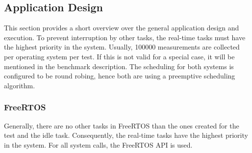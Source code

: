 \subsection{Application Design}
This section provides a short overview over the general application design and execution.
To prevent interruption by other tasks, the real-time tasks must have the highest priority in the system.
Usually, 100000 measurements are collected per operating system per test.
If this is not valid for a special case, it will be mentioned in the benchmark description.
The scheduling for both systems is configured to be round robing, hence both are using a preemptive scheduling algorithm.
 
\subsubsection{FreeRTOS}
Generally, there are no other tasks in FreeRTOS than the ones created for the test and the idle task.
Consequently, the real-time tasks have the highest priority in the system.
For all system calls, the FreeRTOS \ac{API} is used. 

